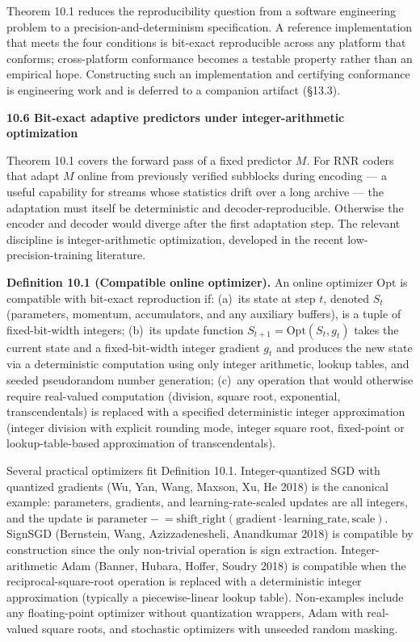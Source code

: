 \documentclass[
]{article}
\begin{document}
Theorem 10.1 reduces the reproducibility question from a software
engineering problem to a precision-and-determinism specification. A
reference implementation that meets the four conditions is bit-exact
reproducible across any platform that conforms; cross-platform
conformance becomes a testable property rather than an empirical hope.
Constructing such an implementation and certifying conformance is
engineering work and is deferred to a companion artifact (§13.3).

\textbf{10.6 Bit-exact adaptive predictors under integer-arithmetic
optimization}

Theorem 10.1 covers the forward pass of a fixed predictor $M$. For RNR
coders that adapt $M$ online from previously verified subblocks during
encoding --- a useful capability for streams whose statistics drift
over a long archive --- the adaptation must itself be deterministic
and decoder-reproducible. Otherwise the encoder and decoder would
diverge after the first adaptation step. The relevant discipline is
integer-arithmetic optimization, developed in the recent
low-precision-training literature.

\textbf{Definition 10.1 (Compatible online optimizer).} An online
optimizer $\mathrm{Opt}$ is compatible with bit-exact reproduction if:
(a)~its state at step $t$, denoted $S_t$ (parameters, momentum,
accumulators, and any auxiliary buffers), is a tuple of
fixed-bit-width integers; (b)~its update function
$S_{t+1} = \mathrm{Opt}(S_t, g_t)$ takes the current state and a
fixed-bit-width integer gradient $g_t$ and produces the new state via
a deterministic computation using only integer arithmetic, lookup
tables, and seeded pseudorandom number generation; (c)~any operation
that would otherwise require real-valued computation (division, square
root, exponential, transcendentals) is replaced with a specified
deterministic integer approximation (integer division with explicit
rounding mode, integer square root, fixed-point or lookup-table-based
approximation of transcendentals).

Several practical optimizers fit Definition 10.1. Integer-quantized
SGD with quantized gradients (Wu, Yan, Wang, Maxson, Xu, He 2018) is
the canonical example: parameters, gradients, and
learning-rate-scaled updates are all integers, and the update is
$\text{parameter} \mathrel{-}= \mathrm{shift\_right}(\text{gradient} \cdot \text{learning\_rate}, \text{scale})$.
SignSGD (Bernstein, Wang, Azizzadenesheli, Anandkumar 2018) is
compatible by construction since the only non-trivial operation is
sign extraction. Integer-arithmetic Adam (Banner, Hubara, Hoffer,
Soudry 2018) is compatible when the reciprocal-square-root operation
is replaced with a deterministic integer approximation (typically a
piecewise-linear lookup table). Non-examples include any
floating-point optimizer without quantization wrappers, Adam with
real-valued square roots, and stochastic optimizers with unseeded
random masking.
\end{document}
